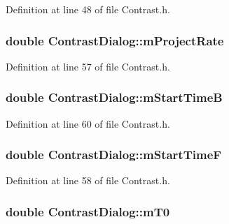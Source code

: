 Definition at line 48 of file Contrast.\+h.

\subsubsection[{\texorpdfstring{m\+Project\+Rate}{mProjectRate}}]{\setlength{\rightskip}{0pt plus 5cm}double Contrast\+Dialog\+::m\+Project\+Rate}\hypertarget{class_contrast_dialog_a49e9139bb89127b69e353d53cc622ebe}{}\label{class_contrast_dialog_a49e9139bb89127b69e353d53cc622ebe}


Definition at line 57 of file Contrast.\+h.

\subsubsection[{\texorpdfstring{m\+Start\+TimeB}{mStartTimeB}}]{\setlength{\rightskip}{0pt plus 5cm}double Contrast\+Dialog\+::m\+Start\+TimeB}\hypertarget{class_contrast_dialog_af45ef9763f5262322dea8d83246b701d}{}\label{class_contrast_dialog_af45ef9763f5262322dea8d83246b701d}


Definition at line 60 of file Contrast.\+h.

\subsubsection[{\texorpdfstring{m\+Start\+TimeF}{mStartTimeF}}]{\setlength{\rightskip}{0pt plus 5cm}double Contrast\+Dialog\+::m\+Start\+TimeF}\hypertarget{class_contrast_dialog_ae7967d81e341dab6fdd180ad21166af6}{}\label{class_contrast_dialog_ae7967d81e341dab6fdd180ad21166af6}


Definition at line 58 of file Contrast.\+h.

\subsubsection[{\texorpdfstring{m\+T0}{mT0}}]{\setlength{\rightskip}{0pt plus 5cm}double Contrast\+Dialog\+::m\+T0}\hypertarget{class_contrast_dialog_a0f1280e4caa1bbb21b999e53f56715df}{}\label{class_contrast_dialog_a0f1280e4caa1bbb21b999e53f56715df}


